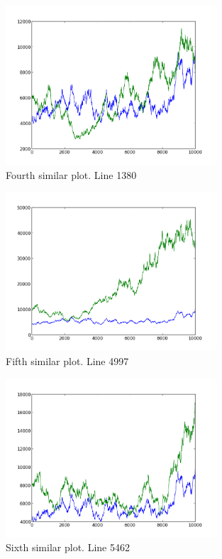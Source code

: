 \begin{figure}[h!]
    \centering
    \includegraphics[width=0.7\textwidth]{images/1380.png}
    \caption{Fourth similar plot.  Line 1380}
    \label{fig:ex1_4}
\end{figure}

\begin{figure}[h!]
    \centering
    \includegraphics[width=0.7\textwidth]{images/4997.png}
    \caption{Fifth similar plot.  Line 4997}
    \label{fig:ex1_5}
\end{figure}

\begin{figure}[h!]
    \centering
    \includegraphics[width=0.7\textwidth]{images/5462.png}
    \caption{Sixth similar plot.  Line 5462}
    \label{fig:ex1_6}
\end{figure}

